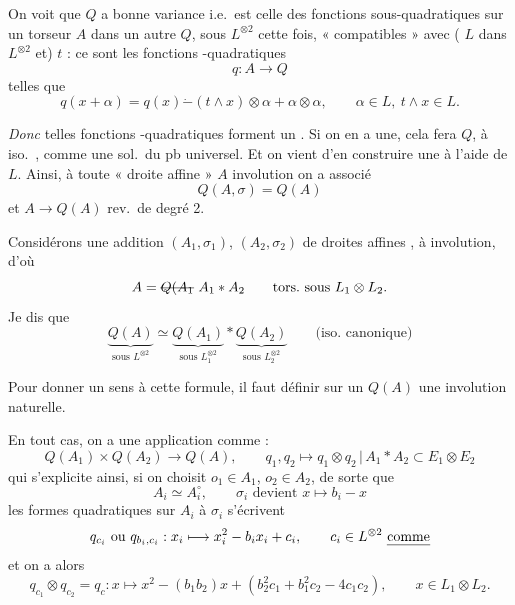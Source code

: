 \documentclass[11pt,a4paper]{article}
\begin{document}
 On voit que $Q$ a bonne variance i.e.\ est celle des fonctions sous-quadratiques sur un torseur $A$ dans un autre $Q$, sous $L^{\otimes 2}$ cette fois, « compatibles » avec \struck{\ill{}} ( $L$ dans $L^{\otimes 2}$ et) $t$ : ce sont les fonctions -quadratiques 
\[
  q : A \longrightarrow Q
\]
telles que
\[
  q(x + \alpha) = q(x) \mathbin{\dot{-}} (t \wedge x) \otimes \alpha + \alpha \otimes \alpha ,
  \qquad \alpha \in L,\ t \wedge x \in L .
\]

\emph{Donc} telles fonctions -quadratiques  forment un . Si on en a une, cela fera $Q$, à iso.\ , comme une sol.\ du pb universel. Et on vient d'en construire une à l'aide de $L$.  Ainsi, à toute « droite affine » $A$   involution on a associé
\[
  Q(A, \sigma) = Q(A)
\]
et $A \longrightarrow Q(A)$ rev.\ de degré 2.

Considérons une addition $(A_1, \sigma_1)$, $(A_2, \sigma_2)$ de droites affines ,  à involution, d'où
\[
  A = \text{\struck{$Q(A_1$}}\ A_1 \ast A_2 \qquad \text{tors.\ sous } L_1 \otimes L_2 .
\]
Je dis que
\[
  \underbrace{Q(A)}_{\text{sous } L^{\otimes 2}} \simeq
  \underbrace{Q(A_1)}_{\text{sous } L_1^{\otimes 2}} \ast
  \underbrace{Q(A_2)}_{\text{sous } L_2^{\otimes 2}}
  \qquad \text{(iso.\ canonique)}
\]

Pour donner un sens à cette formule, il faut définir sur un $Q(A)$ une involution naturelle.

En tout cas,  on a une application comme \ill{} :
\[
  Q(A_1) \times Q(A_2) \longrightarrow Q(A),
  \qquad q_1, q_2 \longmapsto q_1 \otimes q_2 \,|\, A_1 \ast A_2 \subset E_1 \otimes E_2
\]
 qui s'explicite ainsi, si on choisit   $o_1 \in A_1$, $o_2 \in A_2$, de sorte que
\[
  A_i \simeq A_i^{\circ}, \qquad \sigma_i \text{ devient } x \longmapsto b_i - x
\]
les formes quadratiques sur $A_i$   à $\sigma_i$ s'écrivent
\[
  q_{c_i} \text{ ou } q_{b_i, c_i} : x_i \longmapsto x_i^2 - b_i x_i + c_i ,
  \qquad c_i \in L^{\otimes 2} \text{ \uncertain{comme}}
\]
et on a alors
\[
  q_{c_1} \otimes q_{c_2} = q_c :
  x \longmapsto x^2 - (b_1 b_2) x + (b_2^2 c_1 + b_1^2 c_2 - 4 c_1 c_2) ,
  \qquad x \in L_1 \otimes L_2 .
\]
\end{document}
